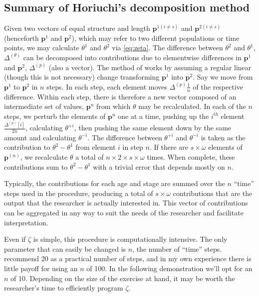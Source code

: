 \documentclass{article}
\begin{document}
\subsection{Summary of Horiuchi's decomposition method}
Given two vectors of equal structure and length $\textbf{p}^{1(i \ne s)}$ and $\textbf{p}^{2(i \ne s)}$ (henceforth $\textbf{p}^1$ and $\textbf{p}^2$), which may refer to two different populations or time points, we may calculate $\theta^1$ and $\theta^2$ via \eqref{eq:zeta}. The difference between $\theta^2$ and $\theta^1$, $\Delta^{(\theta)}$ can be decomposed into contributions due to elementwise differences in $\textbf{p}^1$ and $\textbf{p}^2$, $\Delta^{(p)}$ (also a vector). The method of
\citet{horiuchi2008} works by assuming a regular linear (though this is not necessary) change transforming $\textbf{p}^{1}$ into $\textbf{p}^{2}$. Say we move from $\textbf{p}^1$ to $\textbf{p}^2$ in $n$ steps. In each step, each element moves $\Delta^{(p)} \frac{1}{n}$ of the respective difference. Within each step, there is therefore a new vector composed of an intermediate set of values, $\textbf{p}^n$ from which $\theta$
may be recalculated. In each of the $n$ steps, we perturb the elements of $\textbf{p}^n$ one at a time, pushing up the $i^{th}$ element $\frac{\Delta^{(p)}[i]}{2n}$, calculating $\theta^{+i}$, then pushing the same element down by the same amount and calculating $\theta^{-i}$. The difference between $\theta^{+i}$ and $\theta^{-i}$ is taken as the contribution to $\theta^2-\theta^1$ from element $i$ in step $n$. If there are $s\times\omega$ elements of $\textbf{p}^{(n)}$, we recalculate $\theta$ a total of $n\times2\times s\times\omega$ times. When complete, these contributions sum to $\theta^2-\theta^1$ with a trivial error that depends mostly on $n$.

Typically, the contributions for each age and stage are summed over the $n$ ``time'' steps used in the procedure, producing a total of $s \times \omega$ contributions that are the output that the researcher is actually interested in. This vector of contributions can be aggregated in any way to suit the needs of the researcher and facilitate interpretation. 

Even if $\zeta$ is simple, this procedure is computationally intensive. The only parameter that can easily be changed is $n$, the number of ``time'' steps. \citet{horiuchi2008} recommend 20 as a practical number of steps, and in my own experience there is little payoff for using an $n$ of 100. In the following demonstration we'll opt for an $n$ of 10. Depending on the size of the exercise at hand, it may be worth the researcher's time to efficiently program $\zeta$.
\end{document}
